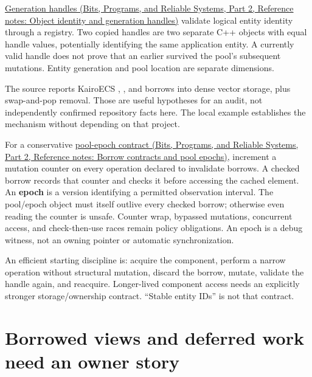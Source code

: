 \href{../01-Bits-Programs-and-Reliable-Systems-P02/main.pdf\#nameddest=appendix-f1581457d322}{Generation handles (Bits, Programs, and Reliable Systems, Part 2, Reference notes: Object identity and generation handles)} validate logical entity identity through a registry. Two copied handles are two separate C++ objects with equal handle values, potentially identifying the same application entity. A currently valid handle does not prove that an earlier  survived the pool's subsequent mutations. Entity generation and pool location are separate dimensions.

The source reports KairoECS , , and  borrows into dense vector storage, plus swap-and-pop removal. Those are useful hypotheses for an audit, not independently confirmed repository facts here. The local  example establishes the mechanism without depending on that project.

For a conservative \href{../01-Bits-Programs-and-Reliable-Systems-P02/main.pdf\#nameddest=appendix-aa405b7c3903}{pool-epoch contract (Bits, Programs, and Reliable Systems, Part 2, Reference notes: Borrow contracts and pool epochs)}, increment a mutation counter on every operation declared to invalidate borrows. A checked borrow records that counter and checks it before accessing the cached element. An \textbf{epoch} is a version identifying a permitted observation interval. The pool/epoch object must itself outlive every checked borrow; otherwise even reading the counter is unsafe. Counter wrap, bypassed mutations, concurrent access, and check-then-use races remain policy obligations. An epoch is a debug witness, not an owning pointer or automatic synchronization.

An efficient starting discipline is: acquire the component, perform a narrow operation without structural mutation, discard the borrow, mutate, validate the handle again, and reacquire. Longer-lived component access needs an explicitly stronger storage/ownership contract. ``Stable entity IDs'' is not that contract.

\section{Borrowed views and deferred work need an owner story}\label{05-engine-i-ch003-borrowed-views-and-deferred-work-need-an-owner-story}


